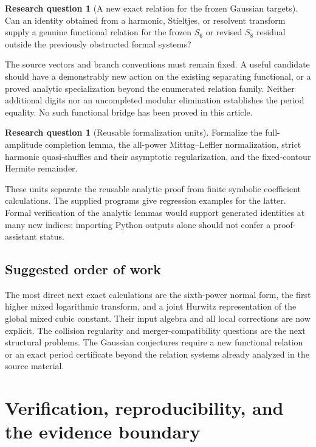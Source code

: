\documentclass[11pt]{article}
\numberwithin{equation}{section}
\theoremstyle{plain}
\theoremstyle{definition}
\newtheorem{question}[theorem]{Research question}
\theoremstyle{remark}
\begin{document}
\begin{question}[A new exact relation for the frozen Gaussian targets]
Can an identity obtained from a harmonic, Stieltjes, or resolvent
transform supply a genuine functional relation for the frozen
$S_6$ or revised $S_8$ residual outside the previously obstructed
formal systems?
\end{question}
The source vectors and branch conventions must remain fixed. A useful
candidate should have a demonstrably new action on the existing
separating functional, or a proved analytic specialization beyond the
enumerated relation family. Neither additional digits nor an
uncompleted modular elimination establishes the period equality.
No such functional bridge has been proved in this article.

\begin{question}[Reusable formalization units]
Formalize the full-amplitude completion lemma, the all-power
Mittag--Leffler normalization, strict harmonic quasi-shuffles and their
asymptotic regularization, and the fixed-contour Hermite remainder.
\end{question}
These units separate the reusable analytic proof from finite symbolic
coefficient calculations. The supplied programs give regression
examples for the latter. Formal verification of the analytic lemmas
would support generated identities at many new indices; importing
Python outputs alone should not confer a proof-assistant status.

\subsection{Suggested order of work}

The most direct next exact calculations are the sixth-power normal
form, the first higher mixed logarithmic transform, and a joint
Hurwitz representation of the global mixed cubic constant. Their input
algebra and all local corrections are now explicit. The collision
regularity and merger-compatibility questions are the next structural
problems. The Gaussian conjectures require a new functional relation or
an exact period certificate beyond the relation systems already
analyzed in the source material.



\section{Verification, reproducibility, and the evidence boundary}
\label{verification:section}
\end{document}
